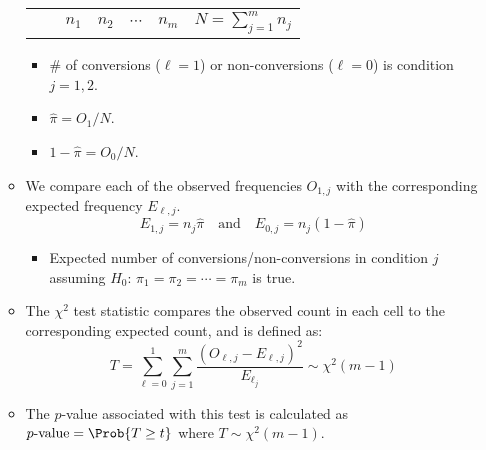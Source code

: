 \begin{itemize}
\begin{itemize}
\begin{table}[!htbp]
\begin{tabularx}{\linewidth}{@{}BYYYYYY@{}}
                                            &                    &  &  & $\cdots$ &  &  \\
                              \end{tabularx}
                        \end{table}
                        \begin{itemize}
                              \item \# of conversions ($ \ell=1 $) or non-conversions ($ \ell=0 $) is condition
                                    $ j=1,2 $.
                              \item $ \hat{\pi}=O_1/N $.
                              \item $ 1-\hat{\pi}=O_0/N $.
                        \end{itemize}
                  \item We compare each of the observed frequencies $ O_{1,j} $ with the corresponding expected
                        frequency $ E_{\ell,j} $.
                        \[ E_{1,j}=n_j\hat{\pi}\quad\text{and}\quad E_{0,j}=n_j(1-\hat{\pi}) \]
                        \begin{itemize}
                              \item Expected number of conversions/non-conversions in condition $ j $
                                    assuming $ H_0 $: $ \pi_1=\pi_2=\cdots=\pi_m $ is true.
                        \end{itemize}
                  \item The $ \chi^2 $ test statistic
                        compares the observed count in each cell to the corresponding expected
                        count, and is defined as:
                        \[ T=\sum_{\ell=0}^{1} \sum_{j=1}^{m} \frac{(O_{\ell,j}-E_{\ell,j})^2}{E_{\ell_j}}\sim \chi^2(m-1)  \]
                  \item The $ p $-value associated with this test is calculated as
                        $ p\text{-value} = \Prob{T\ge t} $ where $ T \sim \chi^2(m-1) $.
            \end{itemize}
\end{itemize}
